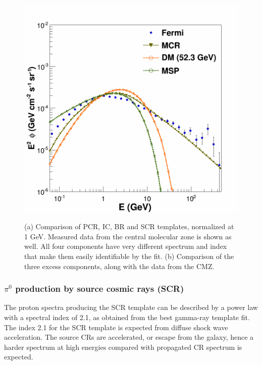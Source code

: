 \begin{figure}[h]
\begin{minipage}[h]{0.45\textwidth}
	  \includegraphics[width=1\linewidth]{pic/method/norm_excess_comp.png}
 	  \subcaption{}
 	  \label{fig:norm_excess_component}
  \end{minipage}
  \caption[Comparison of gamma-ray templates]{(a) Comparison of PCR, IC, BR and SCR templates, normalized at 1 GeV. Measured data from the central molecular zone is shown as well. All four components have very different spectrum and index that make them easily identifiable by the fit. (b) Comparison of the three excess components, along with the data from the CMZ.}
  \label{fig:norm_spectra} 
\end{figure}




%

\subsubsection{$\pi^0$ production by source cosmic rays (SCR)}

The proton spectra producing the SCR template can be described by a power law with a spectral index of 2.1, as obtained from the best gamma-ray template fit. The index 2.1 for the SCR template %
is expected from diffuse shock wave acceleration. \cite{Biermann10} \cite{Hillas2005} 
The source CRs are accelerated, or escape from the galaxy, hence a harder spectrum at high energies compared with propagated CR spectrum is expected.

